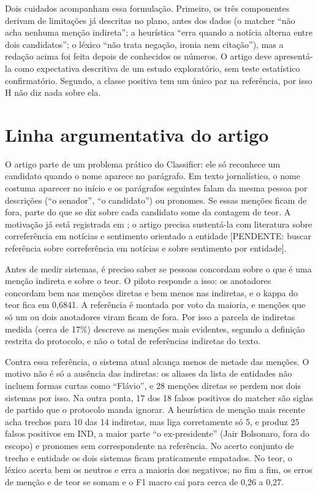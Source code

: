 \documentclass[11pt,a4paper]{article}
\newcommand{\pend}[1]{\textcolor{red!60!black}{[PENDENTE: #1]}}
\begin{document}
Dois cuidados acompanham essa formulação. Primeiro, os três componentes derivam de limitações já descritas no plano, antes dos dados (o matcher \enquote{não acha nenhuma menção indireta}; a heurística \enquote{erra quando a notícia alterna entre dois candidatos}; o léxico \enquote{não trata negação, ironia nem citação}), mas a redação acima foi feita depois de conhecidos os números. O artigo deve apresentá-la como expectativa descritiva de um estudo exploratório, sem teste estatístico confirmatório. Segundo, a classe positiva tem um único par na referência, por isso H não diz nada sobre ela.

\section{Linha argumentativa do artigo}\label{sec:linha}

O artigo parte de um problema prático do Classifier: ele só reconhece um candidato quando o nome aparece no parágrafo. Em texto jornalístico, o nome costuma aparecer no início e os parágrafos seguintes falam da mesma pessoa por descrições (\enquote{o senador}, \enquote{o candidato}) ou pronomes. Se essas menções ficam de fora, parte do que se diz sobre cada candidato some da contagem de teor. A motivação já está registrada em ; o artigo precisa sustentá-la com literatura sobre correferência em notícias e sentimento orientado a entidade \pend{buscar referência sobre correferência em notícias e sobre sentimento por entidade}.

Antes de medir sistemas, é preciso saber se pessoas concordam sobre o que é uma menção indireta e sobre o teor. O piloto responde a isso: os anotadores concordam bem nas menções diretas e bem menos nas indiretas, e o kappa do teor fica em 0,6841. A referência é montada por voto da maioria, e menções que só um ou dois anotadores viram ficam de fora. Por isso a parcela de indiretas medida (cerca de 17\%) descreve as menções mais evidentes, segundo a definição restrita do protocolo, e não o total de referências indiretas do texto.

Contra essa referência, o sistema atual alcança menos de metade das menções. O motivo não é só a ausência das indiretas: os aliases da lista de entidades não incluem formas curtas como \enquote{Flávio}, e 28 menções diretas se perdem nos dois sistemas por isso. Na outra ponta, 17 dos 18 falsos positivos do matcher são siglas de partido que o protocolo manda ignorar. A heurística de menção mais recente acha trechos para 10 das 14 indiretas, mas liga corretamente só 5, e produz 25 falsos positivos em IND, a maior parte \enquote{o ex-presidente} (Jair Bolsonaro, fora do escopo) e pronomes sem correspondente na referência. No acerto conjunto de trecho e entidade os dois sistemas ficam praticamente empatados. No teor, o léxico acerta bem os neutros e erra a maioria dos negativos; no fim a fim, os erros de menção e de teor se somam e o F1 macro cai para cerca de 0,26 a 0,27.
\end{document}
